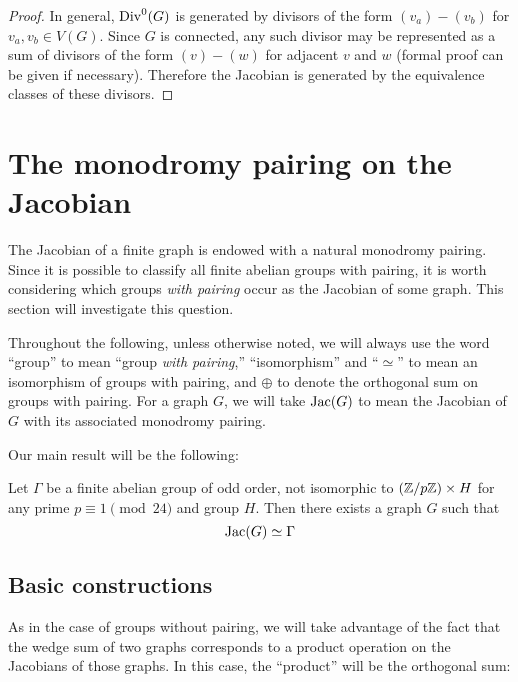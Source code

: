 \documentclass{amsart}
\begin{document}
\begin{proof}
  In general, $\operatorname{Div}^0(G)$ is generated by divisors of the form $(v_a)
  - (v_b)$ for $v_a, v_b \in V(G)$. Since $G$ is connected, any such
  divisor may be represented as a sum of divisors of the form $(v) -
  (w)$ for adjacent $v$ and $w$ (formal proof can be given if
  necessary). Therefore the Jacobian is generated by the equivalence
  classes of these divisors.  
\end{proof}

\section{The monodromy pairing on the Jacobian}


The Jacobian of a finite graph is endowed with a natural monodromy
pairing. Since it is possible to classify all finite abelian groups
with pairing, it is worth considering which groups \emph{with pairing}
occur as the Jacobian of some graph. This section will investigate
this question.

\begin{note}
  Throughout the following, unless otherwise noted, we will always use
  the word ``group'' to mean ``group \emph{with pairing},''
  ``isomorphism'' and ``$\simeq$'' to mean an isomorphism of groups
  with pairing, and $\oplus$ to denote the orthogonal sum on groups
  with pairing. For a graph $G$, we will take $\operatorname{Jac}(G)$ to mean the
  Jacobian of $G$ with its associated monodromy pairing.
\end{note}

Our main result will be the following:

\begin{thm}
  \label{thm:graph_pairing}
  Let $\Gamma$ be a finite abelian group of odd order, not isomorphic
  to $(\mathbb{Z}/p\mathbb{Z}) \times H$ for any prime $p \equiv 1 \pmod {24}$ and
  group $H$. Then there exists a graph $G$ such that
  \[
  \operatorname{Jac}(G) \simeq \Gamma
  \]
\end{thm}

\subsection{Basic constructions}

As in the case of groups without pairing, we will take advantage of
the fact that the wedge sum of two graphs corresponds to a product
operation on the Jacobians of those graphs. In this case, the
``product'' will be the orthogonal sum:
\end{document}
